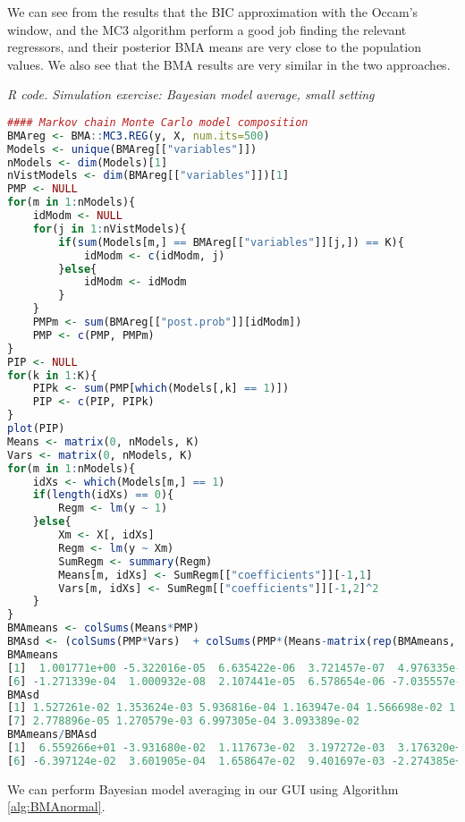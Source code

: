 We can see from the results that the BIC approximation with the Occam's window, and the MC3 algorithm perform a good job finding the relevant regressors, and their posterior BMA means are very close to the population values. We also see that the BMA results are very similar in the two approaches.

\begin{tcolorbox}[enhanced,width=4.67in,center upper,
	fontupper=\large\bfseries,drop shadow southwest,sharp corners]
	\textit{R code. Simulation exercise: Bayesian model average, small setting}
	\begin{VF}
		\begin{lstlisting}[language=R]
#### Markov chain Monte Carlo model composition
BMAreg <- BMA::MC3.REG(y, X, num.its=500)
Models <- unique(BMAreg[["variables"]])
nModels <- dim(Models)[1]
nVistModels <- dim(BMAreg[["variables"]])[1]
PMP <- NULL
for(m in 1:nModels){
	idModm <- NULL
	for(j in 1:nVistModels){
		if(sum(Models[m,] == BMAreg[["variables"]][j,]) == K){
			idModm <- c(idModm, j)
		}else{
			idModm <- idModm
		} 
	}
	PMPm <- sum(BMAreg[["post.prob"]][idModm])
	PMP <- c(PMP, PMPm)
}
PIP <- NULL
for(k in 1:K){
	PIPk <- sum(PMP[which(Models[,k] == 1)])
	PIP <- c(PIP, PIPk)
}
plot(PIP)
Means <- matrix(0, nModels, K)
Vars <- matrix(0, nModels, K)
for(m in 1:nModels){
	idXs <- which(Models[m,] == 1)
	if(length(idXs) == 0){
		Regm <- lm(y ~ 1)
	}else{
		Xm <- X[, idXs]
		Regm <- lm(y ~ Xm)
		SumRegm <- summary(Regm)
		Means[m, idXs] <- SumRegm[["coefficients"]][-1,1]
		Vars[m, idXs] <- SumRegm[["coefficients"]][-1,2]^2 
	} 
}
BMAmeans <- colSums(Means*PMP)
BMAsd <- (colSums(PMP*Vars)  + colSums(PMP*(Means-matrix(rep(BMAmeans, each = nModels), nModels, K))^2))^0.5
BMAmeans
[1]  1.001771e+00 -5.322016e-05  6.635422e-06  3.721457e-07  4.976335e-01
[6] -1.271339e-04  1.000932e-08  2.107441e-05  6.578654e-06 -7.035557e-01 
BMAsd
[1] 1.527261e-02 1.353624e-03 5.936816e-04 1.163947e-04 1.566698e-02 1.987360e-03
[7] 2.778896e-05 1.270579e-03 6.997305e-04 3.093389e-02
BMAmeans/BMAsd
[1]  6.559266e+01 -3.931680e-02  1.117673e-02  3.197272e-03  3.176320e+01
[6] -6.397124e-02  3.601905e-04  1.658647e-02  9.401697e-03 -2.274385e+01
\end{lstlisting}
	\end{VF}
\end{tcolorbox}

We can perform Bayesian model averaging in our GUI using Algorithm \ref{alg:BMAnormal}.  

